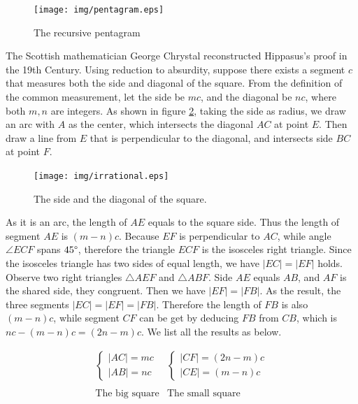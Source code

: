 \documentclass{article}
\begin{document}
\begin{figure}[htbp]
 \centering
 \texttt{[image: img/pentagram.eps]}
 \caption{The recursive pentagram}
 \label{fig:pentagram}
\end{figure}

The Scottish mathematician George Chrystal reconstructed Hippasus's proof in the 19th Century. Using reduction to absurdity, suppose there exists a segment $c$ that measures both the side and diagonal of the square. From the definition of the common measurement, let the side be $mc$, and the diagonal be $nc$, where both $m, n$ are integers. As shown in figure \ref{fig:irrational}, taking the side as radius, we draw an arc with $A$ as the center, which intersects the diagonal $AC$ at point $E$. Then draw a line from $E$ that is perpendicular to the diagonal, and intersects side $BC$ at point $F$.

\begin{figure}[htbp]
 \centering
 \texttt{[image: img/irrational.eps]}
 \caption{The side and the diagonal of the square.}
 \label{fig:irrational}
\end{figure}

As it is an arc, the length of $AE$ equals to the square side. Thus the length of segment $AE$ is $(m - n)c$. Because $EF$ is perpendicular to $AC$, while angle $\angle ECF$ spans $45\degree$, therefore the triangle $ECF$ is the isosceles right triangle. Since the isosceles triangle has two sides of equal length, we have $|EC| = |EF|$ holds. Observe two right triangles $\triangle AEF$ and $\triangle ABF$. Side $AE$ equals $AB$, and $AF$ is the shared side, they congruent. Then we have $|EF| = |FB|$. As the result, the three segments $|EC| = |EF| = |FB|$. Therefore the length of $FB$ is also $(m - n)c$, while segment $CF$ can be get by deducing $FB$ from $CB$, which is $nc - (m - n)c = (2n - m)c$. We list all the results as below.

\[
\begin{array}{c|c}
\begin{cases}
|AC| = mc \\
|AB| = nc
\end{cases} &
\begin{cases}
|CF| = (2n - m)c \\
|CE| = (m - n)c
\end{cases} \\[4ex]
\\
\text{The big square} & \text{The small square}
\end{array}
\]
\end{document}
